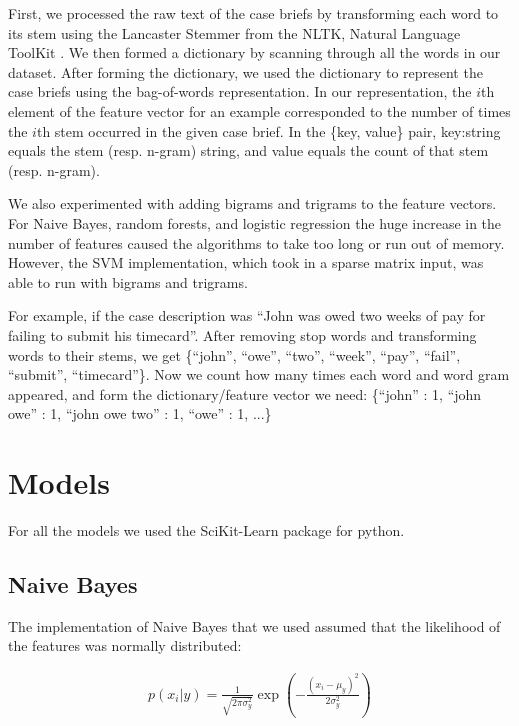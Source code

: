 \documentclass[journal]{IEEEtran}
\begin{document}
First, we processed the raw text of the case briefs by transforming each word to its stem using the Lancaster Stemmer from the NLTK, Natural Language ToolKit \cite{Loper:2002:NNL:1118108.1118117}. We then formed a dictionary by scanning through all the words in our dataset. After forming the dictionary, we used the dictionary to represent the case briefs using the bag-of-words representation. In our representation, the $i$th element of the feature vector for an example corresponded to the number of times the $i$th stem occurred in the given case brief. In the \{key, value\} pair, key:string equals the stem (resp. n-gram) string, and value equals the count of that stem (resp. n-gram).

We also experimented with adding bigrams and trigrams to the feature vectors. For Naive Bayes, random forests, and logistic regression the huge increase in the number of features caused the algorithms to take too long or run out of memory. However, the SVM implementation, which took in a sparse matrix input, was able to run with bigrams and trigrams.

For example, if the case description was ``John was owed two weeks of pay for failing to submit his timecard''. After removing stop words and transforming words to their stems, we get \{``john'', ``owe'', ``two'', ``week'', ``pay'', ``fail'', ``submit'', ``timecard''\}. Now we count how many times each word and word gram appeared, and form the dictionary/feature vector we need: \{``john'' : 1, ``john owe'' : 1, ``john owe two'' : 1, ``owe'' : 1, ...\}

\section{Models}

For all the models we used the SciKit-Learn package \cite{scikit-learn} for python.

\subsection{Naive Bayes}

The implementation of Naive Bayes that we used assumed that the likelihood of the features was normally distributed:

\begin{equation}
\begin{aligned}
p(x_i | y) = \frac{1}{\sqrt{2 \pi \sigma_y^2}} \exp \left ( - \frac{(x_i - \mu_y)^2}{2\sigma_y^2}\right)
\end{aligned}
\end{equation}
\end{document}
